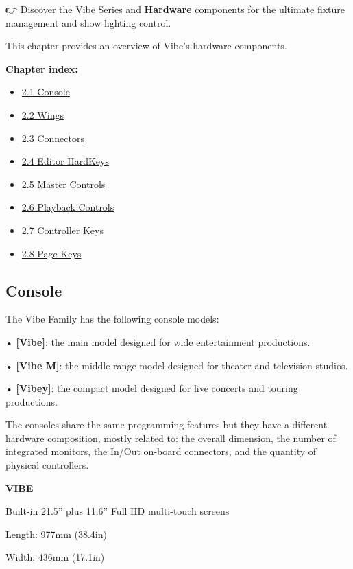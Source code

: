 \documentclass[
]{article}
\providecommand{\tightlist}{%
  \setlength{\itemsep}{0pt}\setlength{\parskip}{0pt}}
\begin{document}
👉 Discover the Vibe Series and \textbf{Hardware} components for the ultimate fixture management and show lighting control.

This chapter provides an overview of Vibe's hardware components.

\textbf{Chapter index:}

\begin{itemize}
\tightlist
\item
  \protect\hyperlink{Console-2.1}{2.1 Console}
\item
  \protect\hyperlink{Wings-2.2}{2.2 Wings}
\item
  \protect\hyperlink{Connectors-2.3}{2.3 Connectors}
\item
  \protect\hyperlink{Editor-HardKeys-2.4}{2.4 Editor HardKeys}
\item
  \protect\hyperlink{Master-Controls-2.5}{2.5 Master Controls}
\item
  \protect\hyperlink{Playback-Controls-2.6}{2.6 Playback Controls}
\item
  \protect\hyperlink{Controller-Keys-2.7}{2.7 Controller Keys}
\item
  \protect\hyperlink{Page-Keys-2.8}{2.8 Page Keys}
\end{itemize}

\hypertarget{Console-2.1}{%
\subsection{Console}\label{Console-2.1}}

The Vibe Family has the following console models:

• \textbf{{[}Vibe{]}}: the main model designed for wide entertainment productions.

• \textbf{{[}Vibe M{]}}: the middle range model designed for theater and television studios.

• \textbf{{[}Vibey{]}}: the compact model designed for live concerts and touring productions.

The consoles share the same programming features but they have a different hardware composition, mostly related to: the overall dimension, the number of integrated monitors, the In/Out on-board connectors, and the quantity of physical controllers.

\textbf{VIBE}

Built-in 21.5'' plus 11.6'' Full HD multi-touch screens

Length: 977mm (38.4in)

Width: 436mm (17.1in)
\end{document}
